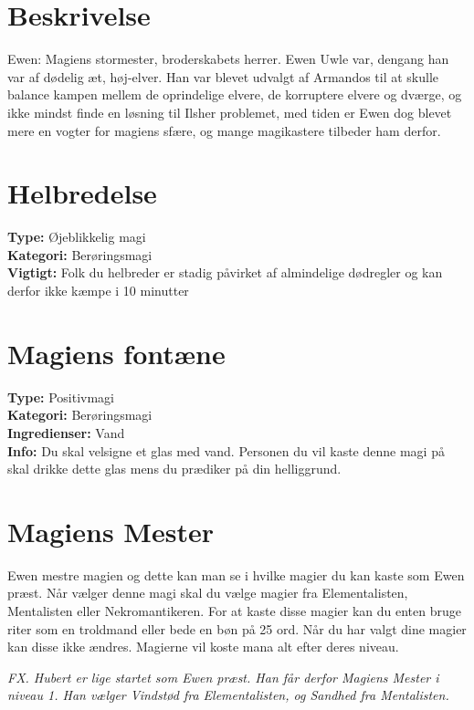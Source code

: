 \section*{Beskrivelse}
Ewen: Magiens stormester, broderskabets herrer. Ewen Uwle var, dengang han var af dødelig æt,
høj-elver. Han var blevet udvalgt af Armandos til at skulle balance kampen mellem de oprindelige
elvere, de korruptere elvere og dværge, og ikke mindst finde en løsning til Ilsher problemet, med tiden
er Ewen dog blevet mere en vogter for magiens sfære, og mange magikastere tilbeder ham derfor.

\section*{Helbredelse}
\textbf{Type:} Øjeblikkelig magi \\
\textbf{Kategori:} Berøringsmagi\\
\textbf{Vigtigt:} Folk du helbreder er stadig påvirket af almindelige dødregler og kan derfor ikke kæmpe i 10 minutter

\section*{Magiens fontæne}
\textbf{Type:} Positivmagi\\
\textbf{Kategori:} Berøringsmagi\\
\textbf{Ingredienser:} Vand\\
\textbf{Info:} Du skal velsigne et glas med vand. Personen du vil kaste denne magi på skal drikke dette glas mens du prædiker på din helliggrund.

\section*{Magiens Mester} Ewen mestre magien og dette kan man se i hvilke magier du kan kaste som Ewen præst. Når vælger denne magi skal du vælge magier fra Elementalisten, Mentalisten eller Nekromantikeren. For at kaste disse magier kan du enten bruge riter som en troldmand eller bede en bøn på 25 ord. Når du har valgt dine magier kan disse ikke ændres. Magierne vil koste mana alt efter deres niveau.

\textit{FX. Hubert er lige startet som Ewen præst. Han får derfor Magiens Mester i niveau 1. Han vælger Vindstød fra Elementalisten, og Sandhed fra Mentalisten.}

